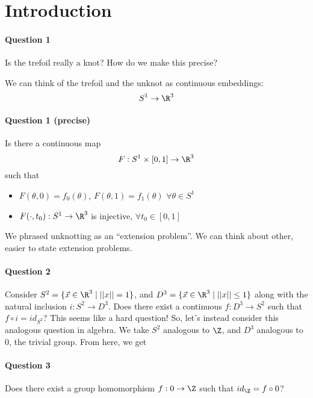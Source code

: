 \documentclass{article}
\begin{document}
\maketitle
\section{Introduction}

\paragraph{Question 1} Is the trefoil really a knot?
How do we make this precise?

We can think of the trefoil and the unknot as continuous embeddings:
\begin{equation}
    S^1 \to \R^3
\end{equation}

\paragraph{Question 1 (precise)} Is there a continuous map
\begin{equation}
    F:S^1 \times [0, 1] \to \R^3
\end{equation}
such that
\begin{itemize}
    \item $F(\theta, 0) = f_0(\theta)$, $F(\theta, 1) = f_1(\theta)$ $\forall \theta \in S^1$
    \item $F(\cdot, t_0): S^1 \to \R^3$ is injective, $\forall t_0 \in [0, 1]$
\end{itemize}

We phrased unknotting as an ``extension problem''.  We can think about other, easier to state extension problems.

\paragraph{Question 2} Consider $S^2 = \{\vec{x} \in \R^3 \mid ||x|| = 1\}$, and $D^3 = \{\vec{x} \in \R^3 \mid ||x|| \leq 1\}$ along with the natural inclusion $i: S^2 \to D^3$.  Does there exist a continuous $f: D^3 \to S^2$ such that $f \circ i = id_{S^2}$?
This seems like a hard question!  So, let's instead consider this analogous question in algebra.  We take $S^2$ analogous to $\Z$, and $D^3$ analogous to $0$, the trivial group. From here, we get
\paragraph{Question 3} Does there exist a group homomorphism $f: 0 \to \Z$ such that $id_\Z = f \circ 0$?
\end{document}
